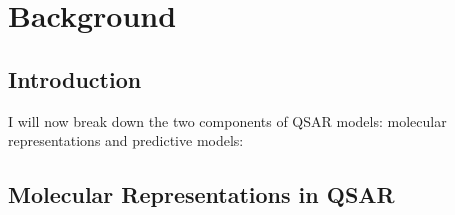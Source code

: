 \chapter{Background}\label{chap:background}\label{sec2}

\section{Introduction}


I will now break down the two components of QSAR models: molecular representations and predictive models:


\section{Molecular Representations in QSAR}

